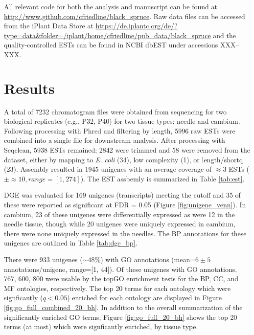 \documentclass[11pt]{article}
\begin{document}
All relevant code for both the analysis and manuscript can be found at
\url{http://www.github.com/cfriedline/black_spruce}.  Raw data files
can be accessed from the iPlant Data Store at
\url{https://de.iplantc.org/de/?type=data&folder=/iplant/home/cfriedline/pub_data/black_spruce}
and the quality-controlled ESTs can be found in NCBI dbEST under accessions
XXX--XXX.

\section*{Results}

A total of 7232 chromatogram files were obtained from sequencing for
two biological replicates (e.g., P32, P40) for two tissue types:
needle and cambium.  Following processing with Phred and filtering by
length, 5996 raw ESTs were combined into a single file for downstream
analysis.  After processing with Seqclean, 5938 ESTs remained; 2842
were trimmed and 58 were removed from the dataset, either by mapping
to \textit{E. coli} (34), low complexity (1), or length/shortq (23).
Assembly resulted in 1945 unigenes with an average coverage of
$\approx{3}$ ESTs ($\pm \approx{10}, range=[1,274]$). The EST assbemly 
is summarized in Table \ref{tab:est}.

DGE was evaluated for 169 unigenes (transcripts) meeting the cutoff
and 35 of these were reported as significant at FDR = 0.05 (Figure
\ref{fig:unigene_venn}).  In cambium, 23 of these unigenes were
differentially expressed as were 12 in the needle tissue, though while
20 unigenes were uniquely expressed in cambium, there were none
uniquely expressed in the needles.  The BP annotations for these
unigenes are outlined in Table \ref{tab:dge_bp}.

There were 933 unigenes ($\sim 48\%$) with GO annotations (mean=$6 \pm
5$ annotations/unigene, range=[1, 44]). Of these unigenes with GO
annotations, 767, 600, 800 were usable by the topGO enrichment tests
for the BP, CC, and MF ontologies, respectively.  The top 20 terms for
each ontology which were signficantly ($q < 0.05$) enriched for each
ontology are displayed in Figure \ref{fig:go_full_combined_20_bh}.  In
addition to the overall summarization of the significantly enriched GO
terms, Figure \ref{fig:go_full_20_bh} shows the top 20 terms (at most) 
which were signficantly enriched, by tissue type.


\end{document}
